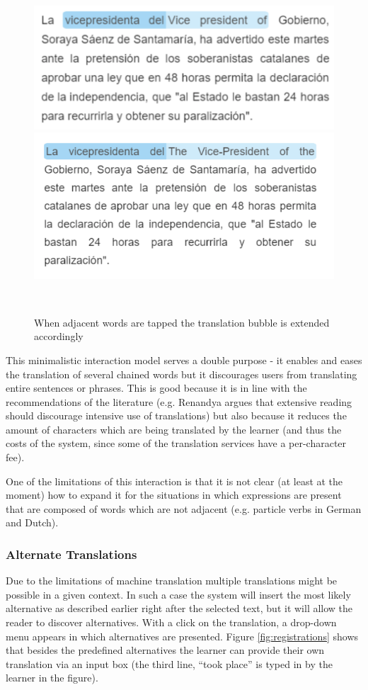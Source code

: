     \begin{figure}[h!]
    \centering
      \includegraphics[width=0.8\columnwidth]{figures/translated_words1}
      \includegraphics[width=0.8\columnwidth]{figures/translated_words2}
      \caption{When adjacent words are tapped the translation bubble is extended accordingly}~\label{fig:translation_extension}
    \end{figure}

This minimalistic interaction model serves a double purpose - it enables and eases the translation of several chained words but it discourages users from translating entire sentences or phrases. This is good because it is in line with the recommendations of the literature (e.g. Renandya argues that extensive reading should discourage intensive use of translations\cite{renadya07-power}) but also because it reduces the amount of characters which are being translated by the learner (and thus the costs of the system, since some of the translation services have a per-character fee). 

One of the limitations of this interaction is that it is not clear (at least at the moment) how to expand it for the situations in which expressions are present that are composed of words which are not adjacent (e.g. particle verbs in German and Dutch).


\subsubsection{Alternate Translations}
Due to the limitations of machine translation multiple translations might be possible in a given context. In such a case the system will insert the most likely alternative as described earlier right after the selected text, but it will allow the reader to discover alternatives. With a click on the translation, a drop-down menu appears in which alternatives are presented. Figure \ref{fig:registrations} shows that besides the predefined alternatives the learner can provide their own translation via an input box (the third line, ``took place'' is typed in by the learner in the figure). 


